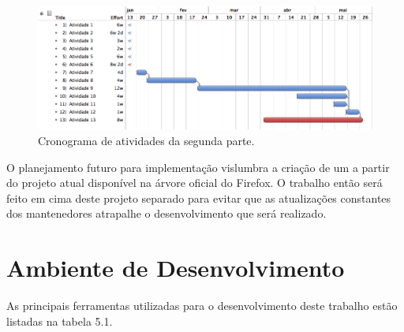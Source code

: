 \documentclass[espaco=simples,appendix=Name]{abnt}
\begin{document}
\begin{figure}[h]
  \centering
    \includegraphics[scale=0.5]{parte2.png}
  \caption{Cronograma de atividades da segunda parte.}
\end{figure}

O planejamento futuro para implementação vislumbra a criação de um  a partir do projeto atual disponível na árvore oficial do Firefox. O trabalho então será feito em cima deste projeto separado para evitar que as atualizações constantes dos mantenedores atrapalhe o desenvolvimento que será realizado.

\section{Ambiente de Desenvolvimento}

As principais ferramentas utilizadas para o desenvolvimento deste trabalho estão listadas na tabela 5.1.
\end{document}
